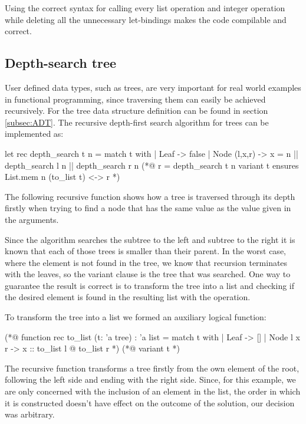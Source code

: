 Using the correct syntax for calling every list operation and integer operation while deleting all the unnecessary let-bindings makes the
code compilable and correct.

\subsection{Depth-search tree}

User defined data types, such as trees, are very important for real world examples in functional programming, since traversing them
can easily be achieved recursively. For the tree data structure definition can be found in section \ref{subsec:ADT}. The recursive 
depth-first search algorithm for trees can be implemented as:

\begin{gospell}
let rec depth_search t n = 
  match t with
  | Leaf -> false
  | Node (l,x,r) -> x = n || depth_search l n || depth_search r n
(*@
  r = depth_search t n
  variant t
  ensures List.mem n (to_list t) <-> r
*)
\end{gospell}

The following recursive function  shows how a tree is traversed through its depth firstly when trying to find
a node that has the same value as the value given in the arguments.

Since the algorithm searches the subtree to the left and subtree to the right it is known that each of those trees is smaller than their
parent. In the worst case, where the element is not found in the tree, we know that recursion terminates with the leaves, so the variant 
clause is the tree that was searched. One way to guarantee the result is correct is to transform the tree into a list and checking if
the desired element is found in the resulting list with the  operation.

To transform the tree into a list we formed an auxiliary logical function:

\begin{gospell}
(*@ function rec to_list (t: 'a tree) : 'a list = 
  match t with
  | Leaf -> []
  | Node l x r -> x :: to_list l @ to_list r
*)
(*@
  variant t
*)
\end{gospell}

The recursive function  transforms a tree firstly from the own element of the root, following the left side and 
ending with the right side. Since, for this example, we are only concerned with the inclusion of an element in the list, the order 
in which it is constructed doesn't have effect on the outcome of the solution, our decision was arbitrary.

